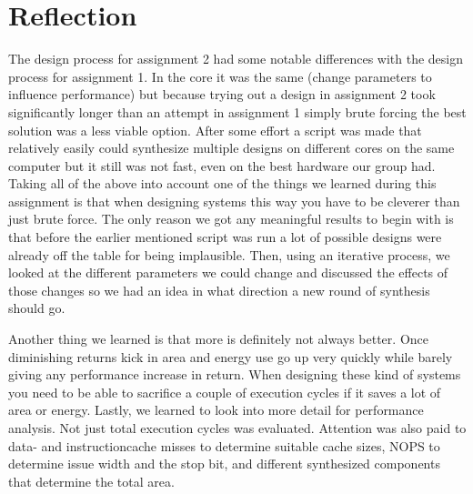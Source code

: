 \section{Reflection}
The design process for assignment 2 had some notable differences with the design process for assignment 1. In the core it was the same (change parameters to influence performance) but because trying out a design in assignment 2 took significantly longer than an attempt in assignment 1 simply brute forcing the best solution was a less viable option. After some effort a script was made that relatively easily could synthesize multiple designs on different cores on the same computer but it still was not fast, even on the best hardware our group had. Taking all of the above into account one of the things we learned during this assignment is that when designing systems this way you have to be cleverer than just brute force. The only reason we got any meaningful results to begin with is that before the earlier mentioned script was run a lot of possible designs were already off the table for being implausible. Then, using an iterative process, we looked at the different parameters we could change and discussed the effects of those changes so we had an idea in what direction a new round of synthesis should go.

Another thing we learned is that more is definitely not always better. Once diminishing returns kick in area and energy use go up very quickly while barely giving any performance increase in return. When designing these kind of systems you need to be able to sacrifice a couple of execution cycles if it saves a lot of area or energy. Lastly, we learned to look into more detail for performance analysis. Not just total execution cycles was evaluated. Attention was also paid to data- and instructioncache misses to determine suitable cache sizes, NOPS to determine issue width and the stop bit, and different synthesized components that determine the total area.